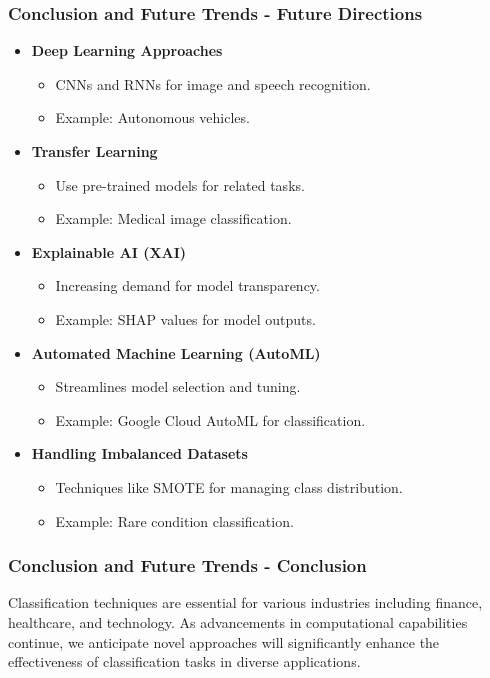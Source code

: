 \documentclass{beamer}
\begin{document}
\begin{frame}[fragile]
    \frametitle{Conclusion and Future Trends - Future Directions}
    \begin{itemize}
        \item \textbf{Deep Learning Approaches}
            \begin{itemize}
                \item CNNs and RNNs for image and speech recognition.
                \item Example: Autonomous vehicles.
            \end{itemize}
        \item \textbf{Transfer Learning}
            \begin{itemize}
                \item Use pre-trained models for related tasks.
                \item Example: Medical image classification.
            \end{itemize}
        \item \textbf{Explainable AI (XAI)}
            \begin{itemize}
                \item Increasing demand for model transparency.
                \item Example: SHAP values for model outputs.
            \end{itemize}
        \item \textbf{Automated Machine Learning (AutoML)}
            \begin{itemize}
                \item Streamlines model selection and tuning.
                \item Example: Google Cloud AutoML for classification.
            \end{itemize}
        \item \textbf{Handling Imbalanced Datasets}
            \begin{itemize}
                \item Techniques like SMOTE for managing class distribution.
                \item Example: Rare condition classification.
            \end{itemize}
    \end{itemize}
\end{frame}

\begin{frame}[fragile]
    \frametitle{Conclusion and Future Trends - Conclusion}
    Classification techniques are essential for various industries including finance, healthcare, and technology. As advancements in computational capabilities continue, we anticipate novel approaches will significantly enhance the effectiveness of classification tasks in diverse applications.
\end{frame}
\end{document}
